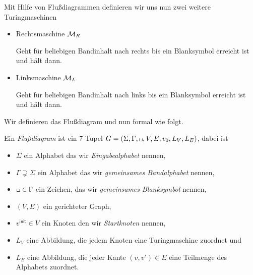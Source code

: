 \begin{Bsp}
 Mit Hilfe von Flußdiagrammen definieren wir uns nun zwei weitere Turingmaschinen
  \begin{itemize}
  \item Rechtsmaschine $\mathcal{M}_R$
  
  Geht für beliebigen Bandinhalt nach rechts bis ein Blanksymbol erreicht ist und hält dann.
  

  
  \item Linksmaschine $\mathcal{M}_L$
  
  Geht für beliebigen Bandinhalt nach links bis ein Blanksymbol erreicht ist und hält dann.

 \end{itemize}
\end{Bsp}

Wir definieren das Flußdiagram und nun formal wie folgt.


\begin{Def}%
Ein \emph{Flußdiagram} ist ein 7-Tupel $G=(\Sigma, \Gamma, \blank,V,E,v_0,L_V,L_E)$, dabei ist
\begin{itemize}
 \item $\Sigma$ ein Alphabet das wir \emph{Eingabealphabet} nennen,
 \item $\Gamma\supsetneq \Sigma$ ein Alphabet das wir \emph{gemeinsames Bandalphabet} nennen,
 \item $\blank\in \Gamma$ ein Zeichen, das wir \emph{gemeinsames Blanksymbol} nennen,
 \item $(V,E)$ ein gerichteter Graph,
 \item $v^\mathsf{init}\in V$ ein Knoten den wir \emph{Startknoten} nennen,
 \item $L_V$ eine Abbildung, die jedem Knoten eine Turingmaschine zuordnet und
 \item $L_E$ eine Abbildung, die jeder Kante $(v,v')\in E$ eine Teilmenge des Alphabets zuordnet.
\end{itemize}
\end{Def}


